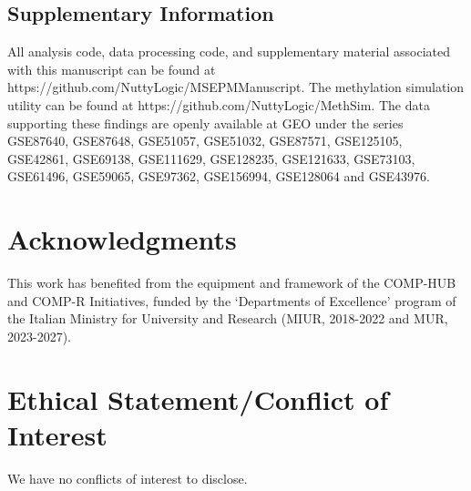 \documentclass{article}
\begin{document}
{\begin{linenumbers}
\subsection{Supplementary Information}

All analysis code, data processing code, and supplementary material associated with this manuscript can be found at
 https://github.com/NuttyLogic/MSEPMManuscript. The methylation simulation utility can be found at 
 https://github.com/NuttyLogic/MethSim. The data supporting these findings are openly available at GEO 
 under the series GSE87640, GSE87648, GSE51057, GSE51032, GSE87571, GSE125105, GSE42861, GSE69138, GSE111629, 
 GSE128235, GSE121633, GSE73103, GSE61496, GSE59065, GSE97362, GSE156994, GSE128064 and GSE43976.


\section{Acknowledgments}
This work has benefited from the equipment and framework of the COMP-HUB and COMP-R Initiatives, funded by 
the ‘Departments of Excellence’ program of the Italian Ministry for University and Research (MIUR, 2018-2022 and MUR, 2023-2027).

\section{Ethical Statement/Conflict of Interest}
We have no conflicts of interest to disclose.

\end{linenumbers}

\printbibliography


\newpage

}
\end{document}
